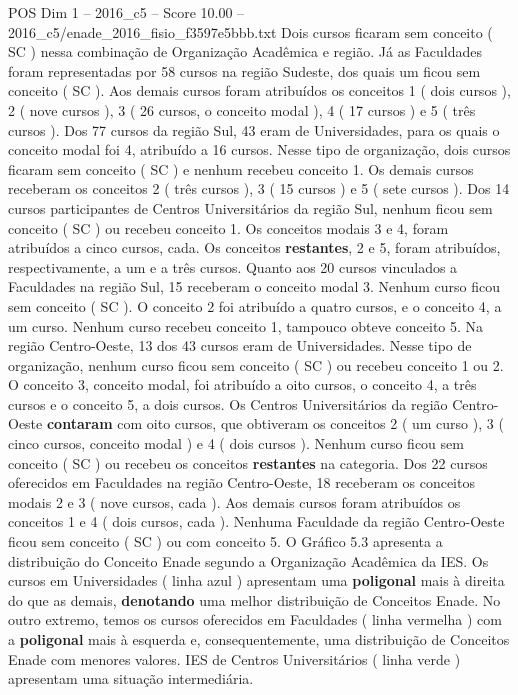 \begin{textsample}{POS Dim 1 – 2016\_c5 – Score 10.00 – 2016\_c5/enade\_2016\_fisio\_f3597e5bbb.txt}
Dois cursos ficaram sem conceito ( SC ) nessa combinação de Organização Acadêmica e região.
Já as Faculdades foram representadas por 58 cursos na região Sudeste, dos quais um ficou sem conceito ( SC ).
Aos demais cursos foram atribuídos os conceitos 1 ( dois cursos ), 2 ( nove cursos ), 3 ( 26 cursos, o conceito modal ), 4 ( 17 cursos ) e 5 ( três cursos ).
Dos 77 cursos da região Sul, 43 eram de Universidades, para os quais o conceito modal foi 4, atribuído a 16 cursos.
Nesse tipo de organização, dois cursos ficaram sem conceito ( SC ) e nenhum recebeu conceito 1.
Os demais cursos receberam os conceitos 2 ( três cursos ), 3 ( 15 cursos ) e 5 ( sete cursos ).
Dos 14 cursos participantes de Centros Universitários da região Sul, nenhum ficou sem conceito ( SC ) ou recebeu conceito 1.
Os conceitos modais 3 e 4, foram atribuídos a cinco cursos, cada.
Os conceitos \textbf{restantes}, 2 e 5, foram atribuídos, respectivamente, a um e a três cursos.
Quanto aos 20 cursos vinculados a Faculdades na região Sul, 15 receberam o conceito modal 3.
Nenhum curso ficou sem conceito ( SC ).
O conceito 2 foi atribuído a quatro cursos, e o conceito 4, a um curso.
Nenhum curso recebeu conceito 1, tampouco obteve conceito 5.
Na região Centro-Oeste, 13 dos 43 cursos eram de Universidades.
Nesse tipo de organização, nenhum curso ficou sem conceito ( SC ) ou recebeu conceito 1 ou 2.
O conceito 3, conceito modal, foi atribuído a oito cursos, o conceito 4, a três cursos e o conceito 5, a dois cursos.
Os Centros Universitários da região Centro-Oeste \textbf{contaram} com oito cursos, que obtiveram os conceitos 2 ( um curso ), 3 ( cinco cursos, conceito modal ) e 4 ( dois cursos ).
Nenhum curso ficou sem conceito ( SC ) ou recebeu os conceitos \textbf{restantes} na categoria.
Dos 22 cursos oferecidos em Faculdades na região Centro-Oeste, 18 receberam os conceitos modais 2 e 3 ( nove cursos, cada ).
Aos demais cursos foram atribuídos os conceitos 1 e 4 ( dois cursos, cada ).
Nenhuma Faculdade da região Centro-Oeste ficou sem conceito ( SC ) ou com conceito 5.
O Gráfico 5.3 apresenta a distribuição do Conceito Enade segundo a Organização Acadêmica da IES.
Os cursos em Universidades ( linha azul ) apresentam uma \textbf{poligonal} mais à direita do que as demais, \textbf{denotando} uma melhor distribuição de Conceitos Enade.
No outro extremo, temos os cursos oferecidos em Faculdades ( linha vermelha ) com a \textbf{poligonal} mais à esquerda e, consequentemente, uma distribuição de Conceitos Enade com menores valores.
IES de Centros Universitários ( linha verde ) apresentam uma situação intermediária.

\end{textsample}
